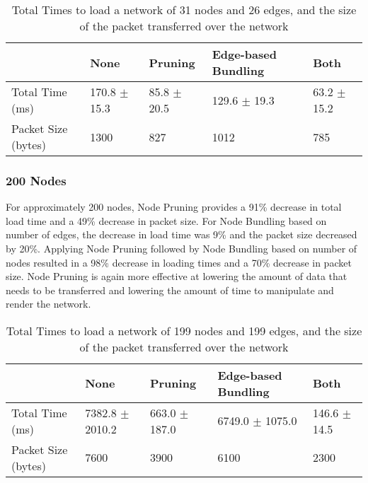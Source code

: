 \documentclass[../dissertation.tex]{subfiles}
\begin{document}
\begin{table}[H]
\centering
\begin{tabular}{|l|l|l|l|l|}
\hline
                    & \textbf{None}    & \textbf{Pruning} & \textbf{Edge-based Bundling}    & \textbf{Both}   \\ \hline
Total Time (ms)     & 170.8 $\pm$ 15.3 & 85.8 $\pm$ 20.5  & 129.6 $\pm$ 19.3 & 63.2 $\pm$ 15.2 \\ \hline
Packet Size (bytes) & 1300             & 827              & 1012             & 785             \\ \hline
\end{tabular}
\caption{Total Times to load a network of 31 nodes and 26 edges, and the size of the packet transferred over the network}
\label{table:30-nodes}
\end{table}

\subsubsection{200 Nodes}

For approximately 200 nodes, Node Pruning provides a 91\% decrease in total load time and a 49\% decrease in packet size. For Node Bundling based on number of edges, the decrease in load time was 9\% and the packet size decreased by 20\%. Applying Node Pruning followed by Node Bundling based on number of nodes resulted in a 98\% decrease in loading times and a 70\% decrease in packet size. Node Pruning is again more effective at lowering the amount of data that needs to be transferred and lowering the amount of time to manipulate and render the network.

\begin{table}[H]
\centering
\begin{tabular}{|l|l|l|l|l|}
\hline
                    & \textbf{None}       & \textbf{Pruning}  & \textbf{Edge-based Bundling}       & \textbf{Both}    \\ \hline
Total Time (ms)     & 7382.8 $\pm$ 2010.2 & 663.0 $\pm$ 187.0 & 6749.0 $\pm$ 1075.0 & 146.6 $\pm$ 14.5 \\ \hline
Packet Size (bytes) & 7600                & 3900              & 6100                & 2300             \\ \hline
\end{tabular}
\caption{Total Times to load a network of 199 nodes and 199 edges, and the size of the packet transferred over the network}
\label{table:200-nodes}
\end{table}
\end{document}
